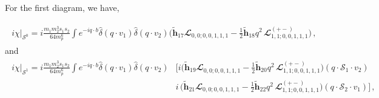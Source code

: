 For the first diagram, we have, 

\begin{align}
    \begin{split} \label{eq8}
        i\chi\Big|_{\mathcal{S}^0} =i\frac{m_1 m_2^3 s_1 s_2}{64 m_p^6}\int e^{-iq\cdot b}\hat\delta(q\cdot v_1)\hat\delta(q\cdot v_2)\Bigg( \boldsymbol{\tilde h}_{17}\mathbfcal{L}_{0,0;0,0,1,1,1}-\frac{1}{2}\boldsymbol{\tilde h}_{18}q^2\,\mathbfcal{L}^{(+-)}_{1,1;0,0,1,1,1}\Bigg)\,,
    \end{split}
\end{align}
and 
\begin{align}
    \begin{split} \label{eq9}
        i\chi\Big|_{\mathcal{S}^1} =i\frac{m_1 m_2^3 s_1 s_2}{64 m_p^6}\int e^{-iq\cdot b}\hat\delta(q\cdot v_1)\hat\delta(q\cdot v_2)&\Bigg[i\Bigg( \boldsymbol{\tilde h}_{19}\mathbfcal{L}_{0,0;0,0,1,1,1}-\frac{1}{2}\boldsymbol{\tilde h}_{20}q^2\,\mathbfcal{L}^{(+-)}_{1,1;0,0,1,1,1}\Bigg)(q\cdot \mathcal{S}_1\cdot v_2)\\&i\,\Bigg( \boldsymbol{\tilde h}_{21}\mathbfcal{L}_{0,0;0,0,1,1,1}-\frac{1}{2}\boldsymbol{\tilde h}_{22}q^2\,\mathbfcal{L}^{(+-)}_{1,1;0,0,1,1,1}\Bigg)(q\cdot \mathcal{S}_2\cdot v_1)\Bigg]\,,
    \end{split}
\end{align}






